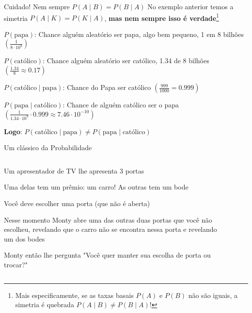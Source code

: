 \begin{frame}{Cuidado! Nem sempre $P(A \mid B) = P(B \mid A)$}
	No exemplo anterior temos a simetria $P(A \mid K) = P(K \mid A)$, \textbf{mas nem sempre isso é verdade}\footnote{Mais especificamente, se as taxas basais $P(A)$ e $P(B)$ não são iguais, a simetria é quebrada $P(A \mid B) \neq P(B \mid A)$!}
	\begin{exemplo}
		\begin{vfilleditems}
			\small{
				\item $P(\text{papa})$: Chance alguém aleatório ser papa, algo bem pequeno, 1 em 8 bilhões $\left( \frac{1}{8 \cdot 10^9} \right)$
				\item $P(\text{católico})$: Chance alguém aleatório ser católico, 1.34 de 8 bilhões $\left( \frac{1.34}{8} \approx 0.17 \right)$
				\item $P(\text{católico} \mid \text{papa})$: Chance do Papa ser católico $\left( \frac{999}{1000} = 0.999 \right)$
				\item $P(\text{papa} \mid \text{católico})$: Chance de alguém católico ser o papa $\left( \frac{1}{1.34 \cdot 10^9} \cdot 0.999 \approx 7.46 \cdot 10^{-10} \right)$
			}
			\item \large{\textbf{Logo}: $P(\text{católico} \mid \text{papa}) \neq P(\text{papa} \mid \text{católico})$}
		\end{vfilleditems}
	\end{exemplo}
\end{frame}

\begin{frame}{Um clássico da Probabilidade}
	\begin{columns}
		\begin{column}{0.6\textwidth}
			\begin{exemplo}
				\begin{vfilleditems}
					\small
					\item Um apresentador de TV lhe apresenta 3 portas
					\item Uma delas tem um prêmio: um carro! As outras tem um bode
					\item Você deve escolher uma porta (que não é aberta)
					\item Nesse momento Monty abre uma das outras duas portas que você
					não escolheu, revelando que o carro não se encontra nessa porta e revelando um dos bodes
					\item Monty então lhe pergunta "Você quer manter sua escolha de porta ou trocar?"
				\end{vfilleditems}
			\end{exemplo}
		\end{column}
		\begin{column}{0.4\textwidth}
			\begin{figure}
				\centering
				\def\svgwidth{\columnwidth}
				
			\end{figure}
		\end{column}
	\end{columns}
\end{frame}

